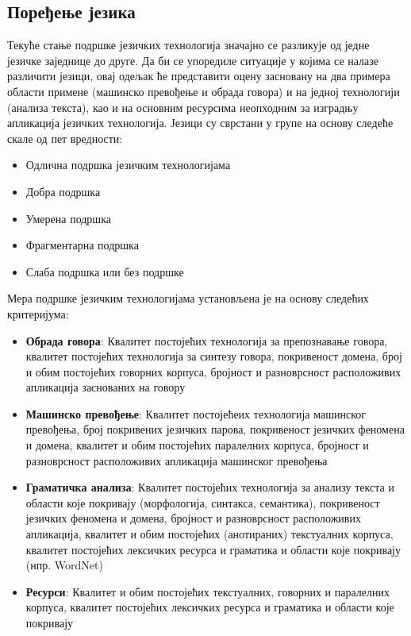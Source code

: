 \begin{multicols}{2}
 \subsection {Поређење језика}
   
Текуће стање подршке језичких технологија значајно се разликује од једне језичке заједнице до друге. Да би се упоредиле ситуације у којима се налазе различити језици, овај одељак ће представити оцену засновану на два примера области примене (машинско превођење и обрада говора) и на једној технологији (анализа текста), као и на основним ресурсима неопходним за изградњу апликација језичких технологија.
Језици су сврстани у групе на основу следеће скале од пет вредности:
\begin{itemize}
\item Одлична подршка језичким технологијама
\item Добра подршка
\item Умерена подршка
\item Фрагментарна подршка
\item Слаба подршка или без подршке 
\end{itemize}
Мера подршке језичким технологијама установљена је на основу следећих критеријума:
\begin{itemize}
\item \textbf{Обрада говора}: Квалитет постојећих технологија за препознавање говора, квалитет постојећих технологија за синтезу говора, покривеност домена, број и обим постојећих говорних корпуса, бројност и разноврсност расположивих апликација заснованих на говору
\item \textbf{Машинско превођење}: Квалитет постојећеих технологија машинског превођења, број покривених језичких парова, покривеност језичких феномена и домена, квалитет и обим постојећих паралелних корпуса, бројност и разноврсност расположивих апликација машинског превођења 
\item \textbf{Граматичка анализа}: Квалитет постојећих технологија за анализу текста и области које покривају (морфологија, синтакса, семантика), покривеност језичких феномена и домена, бројност и разноврсност расположивих апликација, квалитет и обим постојећих (анотираних) текстуалних корпуса, квалитет постојећих лексичких ресурса и граматика и области које покривају (нпр. WordNet)
\item \textbf{Ресурси}: Квалитет и обим постојећих текстуалних, говорних и паралелних корпуса, квалитет постојећих лексичких ресурса и граматика и области које покривају
\end{itemize} 



\end{multicols}
